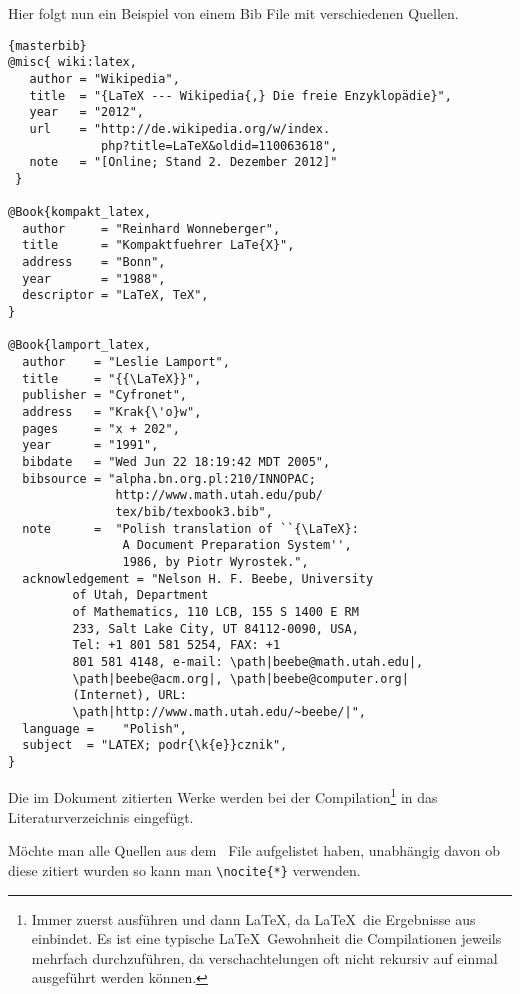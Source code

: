 \noindent 
Hier folgt nun ein Beispiel von einem Bib File mit verschiedenen Quellen.

\begin{center}
\begin{lstlisting}[caption=BibTeX Datei mit verschiedenen Quellen]{masterbib}
@misc{ wiki:latex,
   author = "Wikipedia",
   title  = "{LaTeX --- Wikipedia{,} Die freie Enzyklopädie}",
   year   = "2012",
   url    = "http://de.wikipedia.org/w/index.
             php?title=LaTeX&oldid=110063618",
   note   = "[Online; Stand 2. Dezember 2012]"
 }
 
@Book{kompakt_latex,
  author     = "Reinhard Wonneberger",
  title      = "Kompaktfuehrer LaTe{X}",
  address    = "Bonn",
  year       = "1988",
  descriptor = "LaTeX, TeX",
}

@Book{lamport_latex,
  author    = "Leslie Lamport",
  title     = "{{\LaTeX}}",
  publisher = "Cyfronet",
  address   = "Krak{\'o}w",
  pages     = "x + 202",
  year      = "1991",
  bibdate   = "Wed Jun 22 18:19:42 MDT 2005",
  bibsource = "alpha.bn.org.pl:210/INNOPAC;
               http://www.math.utah.edu/pub/
               tex/bib/texbook3.bib",
  note      =  "Polish translation of ``{\LaTeX}: 
                A Document Preparation System'', 
                1986, by Piotr Wyrostek.",
  acknowledgement = "Nelson H. F. Beebe, University 
         of Utah, Department
         of Mathematics, 110 LCB, 155 S 1400 E RM 
         233, Salt Lake City, UT 84112-0090, USA, 
         Tel: +1 801 581 5254, FAX: +1
         801 581 4148, e-mail: \path|beebe@math.utah.edu|,
         \path|beebe@acm.org|, \path|beebe@computer.org|
         (Internet), URL:
         \path|http://www.math.utah.edu/~beebe/|",
  language =    "Polish",
  subject  = "LATEX; podr{\k{e}}cznik",
}

\end{lstlisting}
\end{center}

\noindent
Die im Dokument zitierten Werke werden bei der Compilation\footnote{Immer 
zuerst \BibTeX ausführen und dann \LaTeX, da \LaTeX~die Ergebnisse aus \BibTeX~
einbindet. Es ist eine typische \LaTeX~Gewohnheit die Compilationen jeweils 
mehrfach durchzuführen, da verschachtelungen oft nicht rekursiv auf einmal 
ausgeführt werden können.} in das Literaturverzeichnis eingefügt.

Möchte man alle Quellen aus dem \BibTeX~File aufgelistet haben, unabhängig 
davon ob diese zitiert wurden so kann man \lstinline|\nocite{*}| verwenden.


